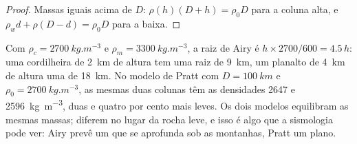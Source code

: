 \begin{proof}
Massas iguais acima de $D$: $\rho(h)(D + h) = \rho_0 D$ para a coluna alta, e
$\rho_w d + \rho(D - d) = \rho_0 D$ para a baixa.
\end{proof}

Com $\rho_c = \qty{2700}{kg.m^{-3}}$ e $\rho_m = \qty{3300}{kg.m^{-3}}$, a raiz de Airy é
$h\times2700/600 = 4.5\,h$: uma cordilheira de \qty{2}{km} de altura tem uma raiz de
\qty{9}{km}, um planalto de \qty{4}{km} de altura uma de \qty{18}{km}. No modelo de Pratt
com $D = \qty{100}{km}$ e $\rho_0 = \qty{2700}{kg.m^{-3}}$, as mesmas duas
colunas têm as densidades 2647 e \qty{2596}{kg.m^{-3}}, duas e quatro por cento
mais leves. Os dois modelos equilibram as mesmas massas; diferem no lugar da rocha leve,
e isso é algo que a sismologia pode ver: Airy prevê um  que se aprofunda sob as montanhas,
Pratt um  plano.


